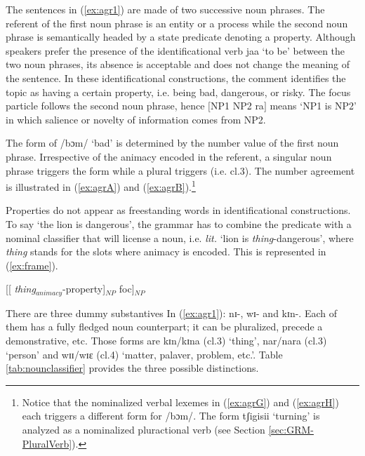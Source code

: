 \begin{exe}
\begin{exe}
\begin{exe}
{\begin{exe}
\begin{exe}
\begin{exe}
\begin{exe}
\begin{exe}
\begin{exe}
\begin{exe}
\begin{exe}
\begin{exe}
\begin{exe}
\begin{exe}
\begin{exe}
\begin{exe}
\begin{exe}
\begin{exe}
\begin{exe}
\begin{exe}
\begin{exe}
\begin{exe}
\z 
 \z

The sentences in (\ref{ex:agr1})  are made of two successive noun phrases. The referent of the 
first 
noun phrase is an entity or a process while the second noun phrase is semantically headed by a 
state 
predicate denoting a property.  Although speakers prefer the presence of   the  identificational 
verb {\sls jaa} `to be' between the two noun phrases, its  absence is acceptable and does not 
change 
the meaning of the sentence. In these  identificational constructions,  the comment identifies the 
topic as having a certain property, i.e. being bad, dangerous, or risky. The focus particle follows 
the second noun phrase, hence  $[$NP1 NP2 ra$]$  means `NP1 is NP2' in which salience or novelty of 
information comes from NP2. 


The form of  {\sls /bɔm/}   `bad' is determined by the number value of the 
first noun phrase. Irrespective of the animacy encoded in the referent, a  
singular noun phrase triggers the form {\sls [bɔŋ]} while a plural triggers 
{\sls [bɔma]} (i.e. {\sc cl.3}).  The number agreement is illustrated in 
(\ref{ex:agrA}) and (\ref{ex:agrB}).\footnote{Notice that the nominalized 
verbal lexemes in (\ref{ex:agrG}) and (\ref{ex:agrH}) each triggers a different 
form for {\sls /bɔm/}. The  form  {\sls tʃigisii}  `turning'  is analyzed as a 
nominalized pluractional verb (see Section \ref{sec:GRM-PluralVerb}).}  

Properties do not appear as  freestanding words in identificational 
constructions. To say `the lion is dangerous', the grammar has to combine the 
predicate with a nominal classifier that will license  a noun,  i.e. {\it lit.}  
`lion is {\it thing}-dangerous',  where {\it thing} stands for the slots where animacy is 
encoded. This is represented in (\ref{ex:frame}).  


\ea\label{ex:frame} [[ {\it thing}$_{animacy}$-property]$_{NP}$ {\sc foc}]$_{NP}$ \z 

There are three 
dummy substantives In  (\ref{ex:agr1}):   {\sls  nɪ-}, {\sls  wɪ-} and  {\sls  kɪn}-.  Each of them 
has a fully fledged noun counterpart; it can be pluralized, precede a demonstrative, etc. Those 
forms are {\sls kɪn}/{\sls  kɪna} ({\sc cl.3})  `thing',  {\sls  nar}/{\sls  nara} ({\sc cl.3}) 
`person' and {\sls wɪɪ}/{\sls  wɪɛ} ({\sc cl.4}) `matter, palaver, problem, etc.'.  Table 
\ref{tab:nounclassifier} provides the three possible
distinctions.  


\begin{table}[htb!]


\end{table}
\end{exe}
\end{exe}
\end{exe}
\end{exe}
\end{exe}
\end{exe}
\end{exe}
\end{exe}
\end{exe}
\end{exe}
\end{exe}
\end{exe}
\end{exe}
\end{exe}
\end{exe}
\end{exe}
\end{exe}
\end{exe}
\end{exe}}
\end{exe}
\end{exe}
\end{exe}
